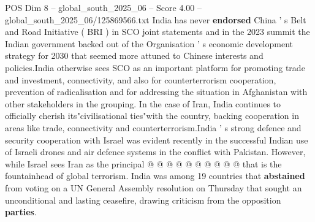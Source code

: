 \begin{textsample}{POS Dim 8 – global\_south\_2025\_06 – Score 4.00 – global\_south\_2025\_06/125869566.txt}
India has never \textbf{endorsed} China ' s Belt and Road Initiative ( BRI ) in SCO joint statements and in the 2023 summit the Indian government backed out of the Organisation ' s economic development strategy for 2030 that seemed more attuned to Chinese interests and policies.India otherwise sees SCO as an important platform for promoting trade and investment, connectivity, and also for counterterrorism cooperation, prevention of radicalisation and for addressing the situation in Afghanistan with other stakeholders in the grouping.
In the case of Iran, India continues to officially cherish its"civilisational ties"with the country, backing cooperation in areas like trade, connectivity and counterterrorism.India ' s strong defence and security cooperation with Israel was evident recently in the successful Indian use of Israeli drones and air defence systems in the conflict with Pakistan.
However, while Israel sees Iran as the principal @ @ @ @ @ @ @ @ @ @ that is the fountainhead of global terrorism.
India was among 19 countries that \textbf{abstained} from voting on a UN General Assembly resolution on Thursday that sought an unconditional and lasting ceasefire, drawing criticism from the opposition \textbf{parties}.

\end{textsample}
